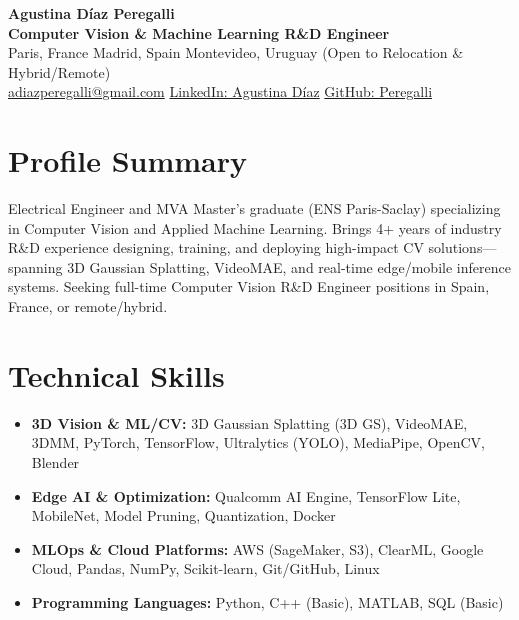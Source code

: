 \documentclass[10pt, a4paper]{article}
\begin{document}
\begin{center}
    {\LARGE \textbf{Agustina Díaz Peregalli}} \\ \vspace{2pt}
    {\large \textbf{Computer Vision \& Machine Learning R\&D Engineer}} \\ \vspace{2pt}
    Paris, France \textbar{} Madrid, Spain \textbar{} Montevideo, Uruguay \textbar{} (Open to Relocation \& Hybrid/Remote) \\ \vspace{2pt}
    \href{mailto:adiazperegalli@gmail.com}{adiazperegalli@gmail.com} \textbar{} 
    \href{https://www.linkedin.com/in/agustina-diaz-peregalli/}{LinkedIn: Agustina Díaz} \textbar{} 
    \href{https://github.com/Peregalli}{GitHub: Peregalli}
\end{center}

\section{Profile Summary}
Electrical Engineer and MVA Master's graduate (ENS Paris-Saclay) specializing in Computer Vision and Applied Machine Learning. Brings 4+ years of industry R\&D experience designing, training, and deploying high-impact CV solutions—spanning 3D Gaussian Splatting, VideoMAE, and real-time edge/mobile inference systems. Seeking full-time Computer Vision R\&D Engineer positions in Spain, France, or remote/hybrid.

\section{Technical Skills}
\begin{itemize}
    \item \textbf{3D Vision \& ML/CV:} 3D Gaussian Splatting (3D GS), VideoMAE, 3DMM, PyTorch, TensorFlow, Ultralytics (YOLO), MediaPipe, OpenCV, Blender
    \item \textbf{Edge AI \& Optimization:} Qualcomm AI Engine, TensorFlow Lite, MobileNet, Model Pruning, Quantization, Docker
    \item \textbf{MLOps \& Cloud Platforms:} AWS (SageMaker, S3), ClearML, Google Cloud, Pandas, NumPy, Scikit-learn, Git/GitHub, Linux
    \item \textbf{Programming Languages:} Python, C++ (Basic), MATLAB, SQL (Basic)
\end{itemize}
\end{document}

